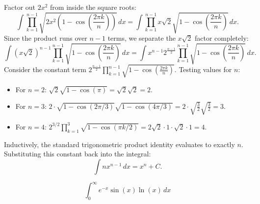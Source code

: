 \begin{questions}
    \begin{solution}
    Factor out $2x^2$ from inside the square roots:
    \[ \int \prod_{k=1}^{n-1} \sqrt{2x^{2}\left(1-\cos\left(\frac{2\pi k}{n}\right)\right)} \, dx = \int \prod_{k=1}^{n-1} x\sqrt{2}\sqrt{1-\cos\left(\frac{2\pi k}{n}\right)} \, dx. \]
    Since the product runs over $n-1$ terms, we separate the $x\sqrt{2}$ factor completely:
    \[ \int (x\sqrt{2})^{n-1} \prod_{k=1}^{n-1} \sqrt{1-\cos\left(\frac{2\pi k}{n}\right)} \, dx = \int x^{n-1} 2^{\frac{n-1}{2}} \prod_{k=1}^{n-1} \sqrt{1-\cos\left(\frac{2\pi k}{n}\right)} \, dx. \]
    Consider the constant term $2^{\frac{n-1}{2}} \prod_{k=1}^{n-1} \sqrt{1-\cos\left(\frac{2\pi k}{n}\right)}$. Testing values for $n$:
    \begin{itemize}
        \item For $n=2$: $\sqrt{2}\sqrt{1-\cos(\pi)} = \sqrt{2}\sqrt{2} = 2$.
        \item For $n=3$: $2 \cdot \sqrt{1-\cos(2\pi/3)}\sqrt{1-\cos(4\pi/3)} = 2 \cdot \sqrt{\frac{3}{2}}\sqrt{\frac{3}{2}} = 3$.
        \item For $n=4$: $2^{3/2} \prod_{k=1}^{3} \sqrt{1-\cos(\pi k / 2)} = 2\sqrt{2} \cdot 1 \cdot \sqrt{2} \cdot 1 = 4$.
    \end{itemize}
    Inductively, the standard trigonometric product identity evaluates to exactly $n$. Substituting this constant back into the integral:
    \[ \int n x^{n-1} \, dx = x^{n} + C. \]
    \end{solution}

    \question
    \[ \int_{0}^{\infty} e^{-x}\sin(x)\ln(x) \, dx \]


\end{questions}
